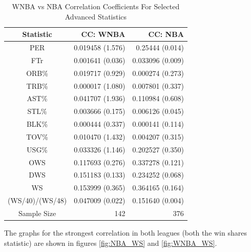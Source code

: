 \documentclass[12pt, titlepage]{article}
\begin{document}
\begin{table}[tbp]
    \caption{WNBA vs NBA Correlation Coefficients For Selected Advanced Statistics}
    \label{tab:main_data}
\centering
\begin{tabular}{crr}
\toprule

Statistic &  CC: WNBA   & CC: NBA \\ 
\midrule
 PER  &  0.019458 (1.576)  & 0.25444 (0.014) \\
 FTr   &  0.001641 (0.036)  & 0.033096 (0.009)       \\ 
 ORB\%   &  0.019717 (0.929)  & 0.000274 (0.273)       \\   
 TRB\%   &  0.000017 (1.080)   & 0.007801 (0.337)       \\
 AST\%   &  0.041707 (1.936)  & 0.110984 (0.608)    \\
 STL\%  &  0.003666 (0.175)  & 0.006126 (0.045)       \\    
 BLK\%  & 0.000444 (0.337)   & 0.000141 (0.114)     \\
 TOV\%  & 0.010470 (1.432)  & 0.004207 (0.315)    \\
 USG\%   & 0.033326 (1.146)   & 0.202527 (0.350)       \\
 OWS   & 0.117693 (0.276)   & 0.337278 (0.121)        \\
 DWS  & 0.151183 (0.133)   & 0.234252 (0.068)         \\
 WS   &  0.153999 (0.365)  & 0.364165 (0.164)                 \\
 (WS/40)/(WS/48)   &  0.047009 (0.022)  & 0.151640 (0.004) \\
 \hline
 Sample Size & 142 & 376\\
 \bottomrule
\end{tabular}
\end{table}


\par
The graphs for the strongest correlation in both leagues (both the win shares statistic) are shown in figures \ref{fig:NBA_WS} and \ref{fig:WNBA_WS}.
\end{document}

